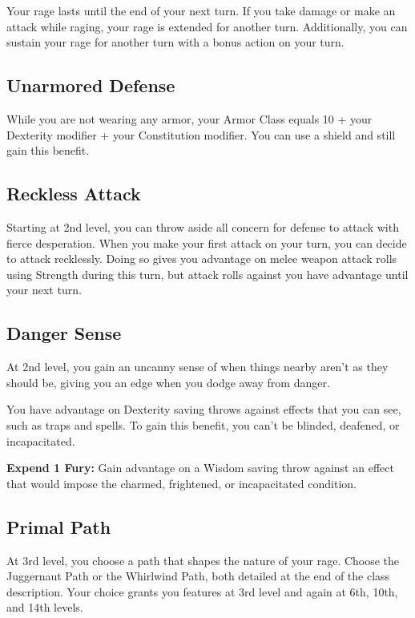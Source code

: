 Your rage lasts until the end of your next turn. If you take damage or make an attack while raging, your rage is extended for another turn. Additionally, you can sustain your rage for another turn with a bonus action on your turn.

\subsection{Unarmored Defense}

While you are not wearing any armor, your Armor Class equals 10 + your Dexterity modifier + your Constitution modifier. You can use a shield and still gain this benefit.

\subsection{Reckless Attack}

Starting at 2nd level, you can throw aside all concern for defense to attack with fierce desperation. When you make your first attack on your turn, you can decide to attack recklessly. Doing so gives you advantage on melee weapon attack rolls using Strength during this turn, but attack rolls against you have advantage until your next turn.

\subsection{Danger Sense}

At 2nd level, you gain an uncanny sense of when things nearby aren't as they should be, giving you an edge when you dodge away from danger.

You have advantage on Dexterity saving throws against effects that you can see, such as traps and spells. To gain this benefit, you can't be blinded, deafened, or incapacitated.

\textbf{Expend 1 Fury:} Gain advantage on a Wisdom saving throw against an effect that would impose the charmed, frightened, or incapacitated condition.

\subsection{Primal Path}

At 3rd level, you choose a path that shapes the nature of your rage. Choose the Juggernaut Path or the Whirlwind Path, both detailed at the end of the class description. Your choice grants you features at 3rd level and again at 6th, 10th, and 14th levels.

